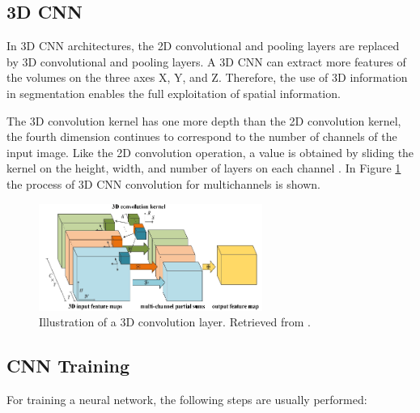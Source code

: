 \subsection*{3D CNN}
\label{subsection:3dcnn}
In \ac{3D} \ac{CNN} architectures, the \ac{2D} convolutional and pooling layers are replaced by \ac{3D} convolutional and pooling layers. A \ac{3D} \ac{CNN} can extract more features of the volumes on the three axes X, Y, and Z. Therefore, the use of \ac{3D} information in segmentation enables the full exploitation of spatial information.

The \ac{3D} convolution kernel has one more depth than the \ac{2D} convolution kernel, the fourth dimension continues to correspond to the number of channels of the input image. Like the \ac{2D} convolution operation, a value is obtained by sliding the kernel on the height, width, and number of layers on each channel \cite{2018guide}. In Figure \ref{fig:cnn_3D} the process of \ac{3D} \ac{CNN} convolution for multichannels is shown.

\begin{figure}[!htb]
  \centering
  \includegraphics[width=0.65\textwidth]{Images/3dconv.jpg}
  \caption[Illustration of a \ac{3D} convolution layer.]{Illustration of a \ac{3D} convolution layer. Retrieved from \cite{CNN:3D}.}
  \label{fig:cnn_3D}
\end{figure}


\subsection{CNN Training}

For training a neural network, the following steps are usually performed:

